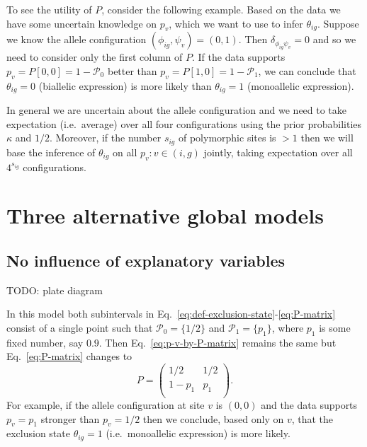\documentclass[letterpaper]{article}
\begin{document}
To see the utility of \(P\), consider the
following
example.  Based on the data we have some uncertain knowledge on \(p_v\),
which we want to use to infer \(\theta_{ig}\).  Suppose we know the allele
configuration \((\phi_{ig},\psi_v)=(0,1)\).  Then
\(\delta_{\phi_{ig}\psi_v}=0\) and so we need to consider only the first column of
\(P\).  If the data supports \(p_v = P[0,0] = 1-\mathcal{P}_0\) better than
\(p_v = P[1,0] = 1-\mathcal{P}_1\), we can conclude that \(\theta_{ig}=0\)
(biallelic expression) is more likely than \(\theta_{ig}=1\) (monoallelic
expression).

In general we are uncertain about the allele configuration and
we need to take expectation (i.e.~average) over all four configurations using the prior
probabilities \(\kappa\) and \(1/2\).  Moreover, if the number \(s_{ig}\) of polymorphic sites
is \(>1\) then we will base the inference of \(\theta_{ig}\) on all
\(p_v: v\in(i,g)\) jointly, taking expectation over all \(4^{s_{ig}}\)
configurations.

\section{Three alternative global models}
\label{sec:models}

\renewcommand{\thesubsection}{M\arabic{model}}

\subsection{No influence of explanatory variables }
\label{sec:model-basic}

TODO: plate diagram

In this model both subintervals in
Eq.~\ref{eq:def-exclusion-state}-\ref{eq:P-matrix} consist
of a single point such that \(\mathcal{P}_0 = \{1/2\}\) and \(\mathcal{P}_1 =
\{p_1\}\), where \(p_1\) is some fixed number, say \(0.9\).  Then
Eq.~\ref{eq:p-v-by-P-matrix} remains the same but Eq.~\ref{eq:P-matrix}
changes to
\begin{equation}
\label{eq:P-matrix-M1}
P =
\begin{pmatrix}
1/2 & 1/2 \\
1-p_1 & p_1 \\
\end{pmatrix}.
\end{equation}
For example, if the allele configuration at site \(v\) is \((0,0)\) and the
data supports \(p_v=p_1\) stronger than \(p_v=1/2\) then we conclude, based
only on \(v\), that the exclusion state \(\theta_{ig}=1\) (i.e.~monoallelic
expression) is more likely.
\end{document}
